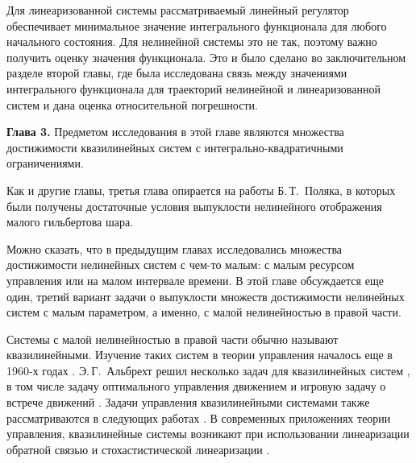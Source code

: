 \documentclass[../main.tex]{subfiles}
\begin{document}
Для линеаризованной системы рассматриваемый линейный регулятор обеспечивает минимальное значение интегрального функционала для любого начального состояния. 
Для нелинейной системы это не так, поэтому важно получить оценку значения функционала. 
Это и было сделано во заключительном разделе второй главы, где была исследована связь между значениями интегрального функционала для траекторий нелинейной и линеаризованной систем и дана оценка относительной погрешности. 

\textbf{Глава 3. }
Предметом исследования в этой главе являются множества достижимости квазилинейных систем с интегрально-квадратичными ограничениями.

Как и другие главы, третья глава опирается на работы Б.\,Т.~Поляка\cite{Polyak2001}, в которых были получены достаточные условия выпуклости нелинейного отображения малого гильбертова шара.

Можно сказать, что в предыдущим главах исследовались множества достижимости нелинейных систем с чем-то малым: с малым ресурсом управления или на малом интервале времени.
В этой главе обсуждается еще один, третий вариант задачи о выпуклости множеств достижимости нелинейных систем с малым параметром, а именно, с малой нелинейностью в правой части. 

Системы с малой нелинейностью в правой части обычно называют квазилинейными. 
Изучение таких систем в теории управления началось еще в 1960-х годах \cite{Subbotin, Kiselev, Kras_book}.
Э.\,Г.~Альбрехт решил несколько задач для квазилинейных систем \cite{Albrecht3}, в том числе задачу оптимального управления движением \cite{Albrecht1} и игровую задачу о встрече движений \cite{Albrecht2}.
Задачи управления квазилинейными системами также рассматриваются в следующих работах \cite{Dauer, Kremlev, KalininLavrinovich2018, Gabasov}.
В современных приложениях теории управления, квазилинейные системы возникают при использовании линеаризации обратной связью и стохастистической линеаризации \cite{Ching, Gui}.
\end{document}
